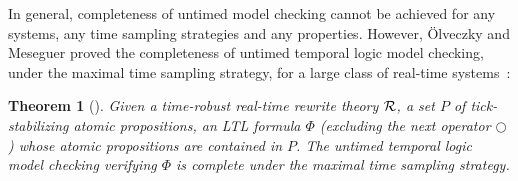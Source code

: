 \documentclass[10pt,journal]{IEEEtran}
\newtheorem{theorem}{Theorem}
\begin{document}
In general, completeness of untimed model checking cannot be achieved
for any systems, any time sampling strategies and any
properties. However, \"Olveczky and Meseguer proved the completeness
of untimed temporal logic model checking, under the maximal time
sampling strategy, for a large class of real-time
systems~\cite{DBLP:journals/entcs/OlveczkyM07a}:
\begin{theorem}[\cite{DBLP:journals/entcs/OlveczkyM07a}]
\label{t:completeness}
Given a \emph{time-robust} real-time rewrite theory $\cal R$, a set
$P$ of \emph{tick-stabilizing} atomic propositions, an LTL formula
$\Phi$ (excluding the \emph{next} operator $\bigcirc$) whose atomic
propositions are contained in $P$. The untimed temporal logic model
checking verifying $\Phi$ is \emph{complete} under the maximal time
sampling strategy.
\end{theorem}
\end{document}

